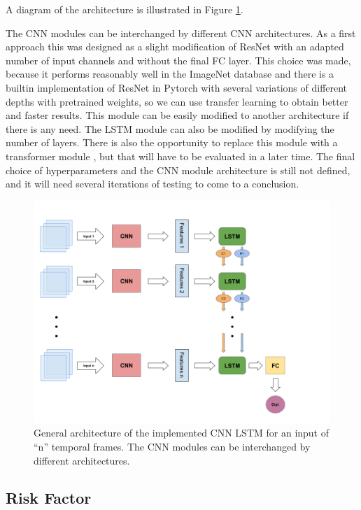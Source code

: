 \documentclass[sigconf, nonacm]{acmart}
\begin{document}
A diagram of the architecture is illustrated in Figure \ref{fig:CNNLSTM}.%

The CNN modules can be interchanged by different CNN architectures. As a first approach this was designed as a slight modification of ResNet \cite{Resnet} with an adapted number of input channels and without the final FC layer. This choice was made, because it performs reasonably well in the ImageNet database and there is a builtin implementation of ResNet in Pytorch with several variations of different depths with pretrained weights, so we can use transfer learning to obtain better and faster results. This module can be easily modified to another architecture if there is any need. The LSTM module can also be modified by modifying the number of layers. There is also the opportunity to replace this module with a transformer module \cite{Atention}, but that will have to be evaluated in a later time. 
The final choice of hyperparameters and the CNN module architecture is still not defined, and it will need several iterations of testing to come to a conclusion.


\begin{figure}
  \centering
  \includegraphics[width=1.2\linewidth]{figures/Architecture CNNLSTM(1).png}
  \caption{General architecture of the implemented CNN LSTM for an input of ``n'' temporal frames. The CNN modules can be interchanged by different architectures.}
  \label{fig:CNNLSTM}
\end{figure}

\subsection{Risk Factor}
\end{document}
